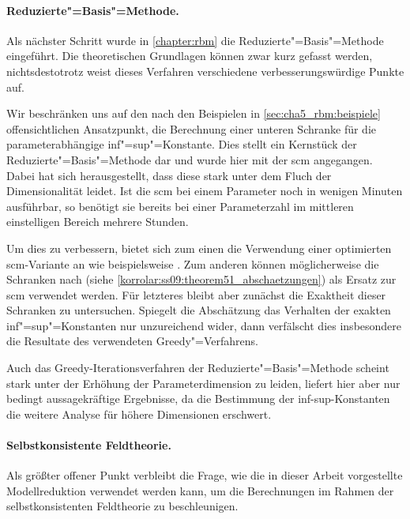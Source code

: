 \documentclass[../main.tex]{subfiles}
\begin{document}
\paragraph{Reduzierte"=Basis"=Methode.} %
\label{par:reduzierte_basis_methode}

Als nächster Schritt wurde in \cref{chapter:rbm} die Reduzierte"=Basis"=Methode eingeführt.
Die theoretischen Grundlagen können zwar kurz gefasst werden, nichtsdestotrotz weist dieses Verfahren verschiedene verbesserungswürdige Punkte auf.

Wir beschränken uns auf den nach den Beispielen in \cref{sec:cha5_rbm:beispiele} offensichtlichen Ansatzpunkt, die Berechnung einer unteren Schranke für die parameterabhängige inf"=sup"=Konstante.
Dies stellt ein Kernstück der Reduzierte"=Basis"=Methode dar und wurde hier mit der \acl{scm} angegangen.
Dabei hat sich herausgestellt, dass diese stark unter dem Fluch der Dimensionalität leidet.
Ist die \ac{scm} bei einem Parameter noch in wenigen Minuten ausführbar, so benötigt sie bereits bei einer Parameterzahl im mittleren einstelligen Bereich mehrere Stunden.


Um dies zu verbessern, bietet sich zum einen die Verwendung einer optimierten \ac{scm}-Variante an wie beispielsweise \cite{Huynh2010}.
Zum anderen können möglicherweise die Schranken nach \cite{Schwab:2009ec} (siehe \cref{korrolar:ss09:theorem51_abschaetzungen}) als Ersatz zur \ac{scm} verwendet werden.
Für letzteres bleibt aber zunächst die Exaktheit dieser Schranken zu untersuchen.
Spiegelt die Abschätzung das Verhalten der exakten inf"=sup"=Konstanten nur unzureichend wider, dann verfälscht dies insbesondere die Resultate des verwendeten Greedy"=Verfahrens.

Auch das Greedy-Iterationsverfahren der Reduzierte"=Basis"=Methode scheint stark unter der Erhöhung der Parameterdimension zu leiden, liefert hier aber nur bedingt aussagekräftige Ergebnisse, da die Bestimmung der inf-sup-Konstanten die weitere Analyse für höhere Dimensionen erschwert.

\paragraph{Selbstkonsistente Feldtheorie.} %
\label{par:selbstkonsistente_feldtheorie}

Als größter offener Punkt verbleibt die Frage, wie die in dieser Arbeit vorgestellte Modellreduktion verwendet werden kann, um die Berechnungen im Rahmen der selbstkonsistenten Feldtheorie zu beschleunigen.
\end{document}

